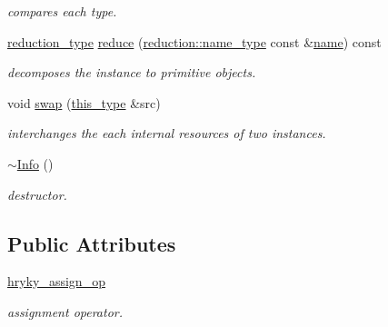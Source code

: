 \begin{DoxyCompactItemize}
\begin{DoxyCompactList}\small\item\em compares each type. \end{DoxyCompactList}\item 
\hypertarget{classhryky_1_1type_1_1_info_a04426ac3d558a06eb28f569fd18685de}{\hyperlink{namespacehryky_a343a9a4c36a586be5c2693156200eadc}{reduction\-\_\-type} \hyperlink{classhryky_1_1type_1_1_info_a04426ac3d558a06eb28f569fd18685de}{reduce} (\hyperlink{namespacehryky_1_1reduction_ac686c30a4c8d196bbd0f05629a6b921f}{reduction\-::name\-\_\-type} const \&\hyperlink{classhryky_1_1type_1_1_info_a08e5ca8ce8eeafe8c5ee7a82fc5fb832}{name}) const }\label{classhryky_1_1type_1_1_info_a04426ac3d558a06eb28f569fd18685de}

\begin{DoxyCompactList}\small\item\em decomposes the instance to primitive objects. \end{DoxyCompactList}\item 
\hypertarget{classhryky_1_1type_1_1_info_a556f2523eefa752022f6441bdc382837}{void \hyperlink{classhryky_1_1type_1_1_info_a556f2523eefa752022f6441bdc382837}{swap} (\hyperlink{classhryky_1_1type_1_1_info_add4519e2ccc4c1ea0266694bc15135b7}{this\-\_\-type} \&src)}\label{classhryky_1_1type_1_1_info_a556f2523eefa752022f6441bdc382837}

\begin{DoxyCompactList}\small\item\em interchanges the each internal resources of two instances. \end{DoxyCompactList}\item 
\hypertarget{classhryky_1_1type_1_1_info_a9007fd6ed03eb73e6eea97d92bae3398}{\hyperlink{classhryky_1_1type_1_1_info_a9007fd6ed03eb73e6eea97d92bae3398}{$\sim$\-Info} ()}\label{classhryky_1_1type_1_1_info_a9007fd6ed03eb73e6eea97d92bae3398}

\begin{DoxyCompactList}\small\item\em destructor. \end{DoxyCompactList}\end{DoxyCompactItemize}
\subsection*{Public Attributes}
\begin{DoxyCompactItemize}
\item 
\hypertarget{classhryky_1_1type_1_1_info_ada7b36c7c9db6e6844aaf4bd8bdc54ac}{\hyperlink{classhryky_1_1type_1_1_info_ada7b36c7c9db6e6844aaf4bd8bdc54ac}{hryky\-\_\-assign\-\_\-op}}\label{classhryky_1_1type_1_1_info_ada7b36c7c9db6e6844aaf4bd8bdc54ac}

\begin{DoxyCompactList}\small\item\em assignment operator. \end{DoxyCompactList}\end{DoxyCompactItemize}


